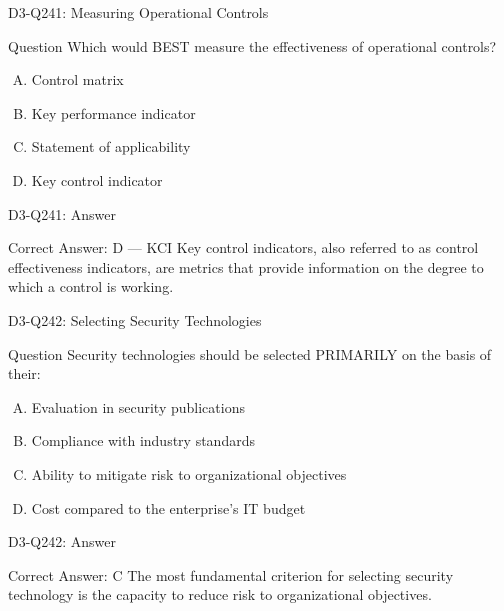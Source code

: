\documentclass{beamer}
\begin{document}
	\begin{frame}{D3-Q241: Measuring Operational Controls}
		\begin{block}{Question}
			Which would BEST measure the effectiveness of operational controls?
		\end{block}
		\begin{enumerate}[(A)]
			\item Control matrix
			\item Key performance indicator
			\item Statement of applicability
			\item Key control indicator
		\end{enumerate}
	\end{frame}
	\begin{frame}{D3-Q241: Answer}
		\begin{block}{Correct Answer: D --- KCI}
			Key control indicators, also referred to as control effectiveness indicators, are metrics that provide information on the degree to which a control is working.
		\end{block}
	\end{frame}
	
	\begin{frame}{D3-Q242: Selecting Security Technologies}
		\begin{block}{Question}
			Security technologies should be selected PRIMARILY on the basis of their:
		\end{block}
		\begin{enumerate}[(A)]
			\item Evaluation in security publications
			\item Compliance with industry standards
			\item Ability to mitigate risk to organizational objectives
			\item Cost compared to the enterprise's IT budget
		\end{enumerate}
	\end{frame}
	\begin{frame}{D3-Q242: Answer}
		\begin{block}{Correct Answer: C}
			The most fundamental criterion for selecting security technology is the capacity to reduce risk to organizational objectives.
		\end{block}
	\end{frame}
	
\end{document}
